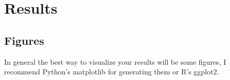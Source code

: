 \documentclass{project-logbook}
\begin{document}
{%


\section{Results} %
\label{sec:results}

\subsection{Figures} %
\label{sub:figures}

\begin{tip}
In general the best way to visualize your results will be some figures, I recommend Python's matplotlib for generating them or R's ggplot2.
\end{tip}

}
\end{document}
